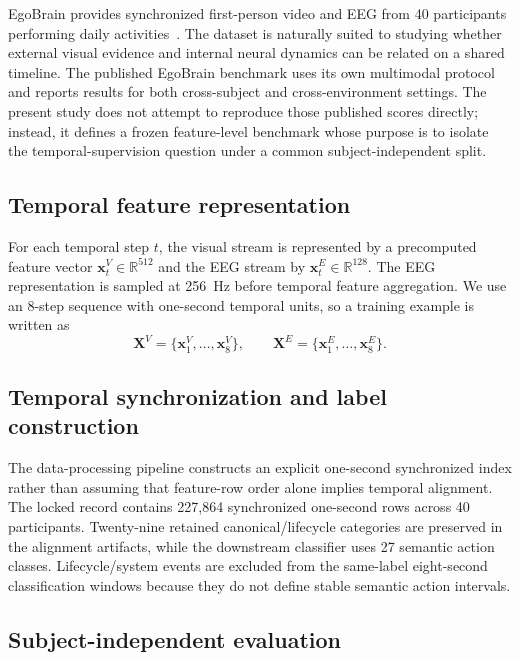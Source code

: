 \documentclass[runningheads]{llncs}
\begin{document}
EgoBrain provides synchronized first-person video and EEG from 40 participants performing daily activities~\cite{lin2026egobrain}. The dataset is naturally suited to studying whether external visual evidence and internal neural dynamics can be related on a shared timeline. The published EgoBrain benchmark uses its own multimodal protocol and reports results for both cross-subject and cross-environment settings. The present study does not attempt to reproduce those published scores directly; instead, it defines a frozen feature-level benchmark whose purpose is to isolate the temporal-supervision question under a common subject-independent split.

\subsection{Temporal feature representation}

For each temporal step $t$, the visual stream is represented by a precomputed feature vector
$\mathbf{x}^{V}_{t}\in\mathbb{R}^{512}$ and the EEG stream by
$\mathbf{x}^{E}_{t}\in\mathbb{R}^{128}$. The EEG representation is sampled at 256~Hz before temporal feature aggregation. We use an 8-step sequence with one-second temporal units, so a training example is written as
\begin{equation}
\mathbf{X}^{V}=\{\mathbf{x}^{V}_{1},\ldots,\mathbf{x}^{V}_{8}\},
\qquad
\mathbf{X}^{E}=\{\mathbf{x}^{E}_{1},\ldots,\mathbf{x}^{E}_{8}\}.
\end{equation}

\subsection{Temporal synchronization and label construction}

The data-processing pipeline constructs an explicit one-second synchronized index rather than assuming that feature-row order alone implies temporal alignment. The locked record contains 227,864 synchronized one-second rows across 40 participants. Twenty-nine retained canonical/lifecycle categories are preserved in the alignment artifacts, while the downstream classifier uses 27 semantic action classes. Lifecycle/system events are excluded from the same-label eight-second classification windows because they do not define stable semantic action intervals.

\subsection{Subject-independent evaluation}
\end{document}
